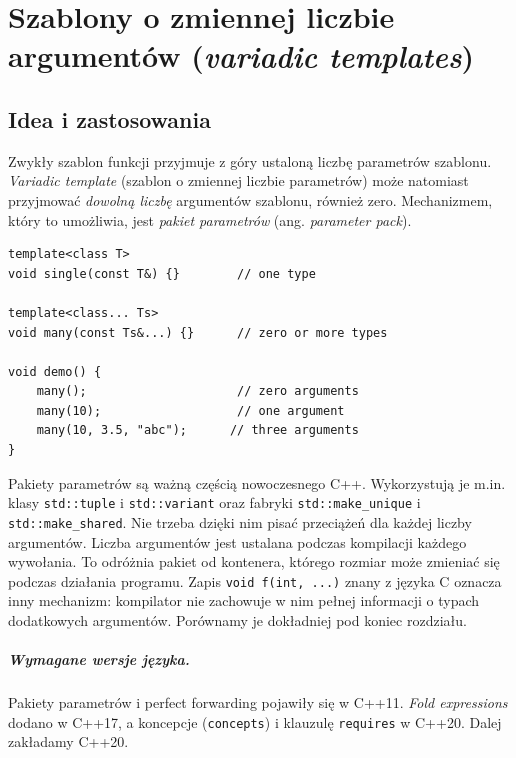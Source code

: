 
\chapter[Variadic templates w C++]{Szablony o zmiennej liczbie argumentów (\textit{variadic templates})}
\label{chap:variadic-templates-cpp}

\section{Idea i zastosowania}

Zwykły szablon funkcji przyjmuje z góry ustaloną liczbę parametrów
szablonu. \emph{Variadic template} (szablon o zmiennej liczbie parametrów)
może natomiast przyjmować \emph{dowolną liczbę} argumentów szablonu,
również zero. Mechanizmem, który to umożliwia, jest
\emph{pakiet parametrów} (ang. \emph{parameter pack}).

\begin{lstlisting}
template<class T>
void single(const T&) {}        // one type

template<class... Ts>
void many(const Ts&...) {}      // zero or more types

void demo() {
    many();                     // zero arguments
    many(10);                   // one argument
    many(10, 3.5, "abc");      // three arguments
}
\end{lstlisting}

Pakiety parametrów są ważną częścią nowoczesnego C++.
Wykorzystują je m.in. klasy \texttt{std::tuple} i \texttt{std::variant}
oraz fabryki \texttt{std::make\_unique} i \texttt{std::make\_shared}.
Nie trzeba dzięki nim pisać przeciążeń dla każdej
liczby argumentów.
Liczba argumentów jest ustalana podczas kompilacji każdego wywołania.
To odróżnia pakiet od kontenera, którego rozmiar może zmieniać się
podczas działania programu. Zapis \texttt{void f(int, ...)} znany
z języka C oznacza inny mechanizm: kompilator nie zachowuje w nim
pełnej informacji o typach dodatkowych argumentów. Porównamy je
dokładniej pod koniec rozdziału.

\paragraph{Wymagane wersje języka.}
Pakiety parametrów i perfect forwarding pojawiły się w C++11.
\emph{Fold expressions} dodano w C++17, a koncepcje
(\texttt{concepts}) i klauzulę \texttt{requires} w C++20.
Dalej zakładamy C++20.

